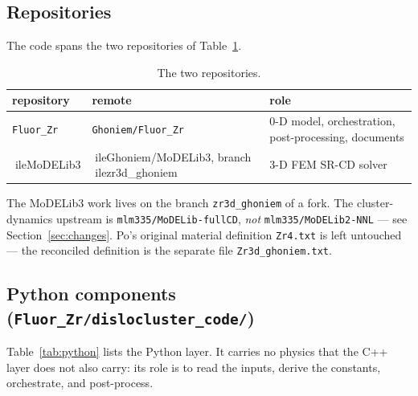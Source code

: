 \documentclass[11pt]{article}
\newcommand{\MoD}{\textsf{MoDELib3}}
\newcommand{\file}[1]{\texttt{\footnotesize #1}}
\begin{document}
\subsection{Repositories}

The code spans the two repositories of Table~\ref{tab:repos}.

\begin{table}[htbp]
\centering
\caption{The two repositories.}
\label{tab:repos}
\begin{tabular}{@{}lll@{}}
\toprule
repository & remote & role \\
\midrule
\file{Fluor\_Zr} & \file{Ghoniem/Fluor\_Zr} &
  0-D model, orchestration, post-processing, documents \\
ile{MoDELib3} & ile{Ghoniem/MoDELib3}, branch ile{zr3d\_ghoniem} &
  3-D FEM SR-CD solver \\
\bottomrule
\end{tabular}
\end{table}

\noindent
The \MoD{} work lives on the branch \file{zr3d\_ghoniem} of a fork. The
cluster-dynamics upstream is \file{mlm335/MoDELib-fullCD}, \emph{not}
\file{mlm335/MoDELib2-NNL} --- see Section~\ref{sec:changes}. Po's original
material definition \file{Zr4.txt} is left untouched --- the reconciled
definition is the separate file \file{Zr3d\_ghoniem.txt}.

\subsection{Python components (\file{Fluor\_Zr/dislocluster\_code/})}

Table~\ref{tab:python} lists the Python layer. It carries no physics that the
C++ layer does not also carry: its role is to read the inputs, derive the
constants, orchestrate, and post-process.
\end{document}
